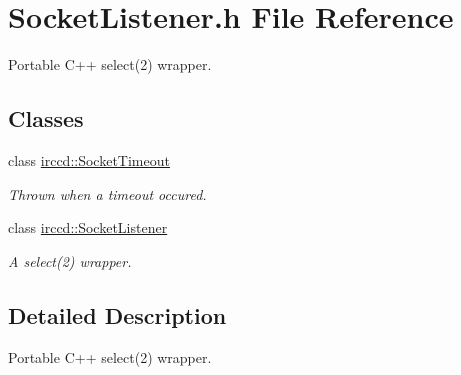 \hypertarget{a00143}{\section{Socket\-Listener.\-h File Reference}
\label{a00143}
}


Portable C++ select(2) wrapper.  


\subsection*{Classes}
\begin{DoxyCompactItemize}
\item 
class \hyperlink{a00066}{irccd\-::\-Socket\-Timeout}
\begin{DoxyCompactList}\small\item\em Thrown when a timeout occured. \end{DoxyCompactList}\item 
class \hyperlink{a00065}{irccd\-::\-Socket\-Listener}
\begin{DoxyCompactList}\small\item\em A select(2) wrapper. \end{DoxyCompactList}\end{DoxyCompactItemize}


\subsection{Detailed Description}
Portable C++ select(2) wrapper. 